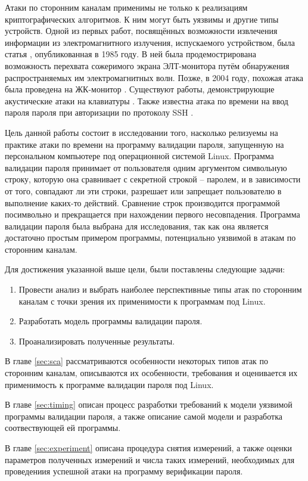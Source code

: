 Атаки по сторонним каналам применимы не только к реализациям криптографических
алгоритмов. К ним могут быть уязвимы и другие типы устройств. Одной из первых
работ, посвящённых возможности извлечения информации из электромагнитного
излучения, испускаемого устройством, была статья \cite{van-eck}, опубликованная
в 1985 году. В ней была продемострирована возможность перехвата сожеримого
экрана ЭЛТ-монитора путём обнаружения распространяемых им электромагнитных волн.
Позже, в 2004 году, похожая атака была проведена на ЖК-монитор \cite{kuhn}.
Существуют работы, демонстрирующие акустические атаки на клавиатуры
\cite{asonov} \cite{zhuang}. Также известна атака по времени на ввод пароля пароля
при авторизации по протоколу SSH \cite{ssh}.

Цель данной работы состоит в исследовании того, насколько релизуемы на практике
атаки по времени на программу валидации пароля, запущенную на персональном
компьютере под операционной системой Linux. Программа валидации пароля
принимает от пользователя одним аргументом символьную строку, которую она
сравнивает с секретной строкой -- паролем, и в зависимости от того, совпадают
ли эти строки, разрешает или запрещает пользователю в выполнение каких-то
действий. Сравнение строк производится программой посимвольно и прекращается
при нахождении первого несовпадения. Программа валидации пароля была выбрана
для исследования, так как она является достаточно простым примером программы,
потенциально уязвимой в атакам по сторонним каналам.

Для достижения указанной выше цели, были поставлены следующие задачи:
\begin{enumerate}
\item Провести анализ и выбрать наиболее перспективные типы атак по сторонним
  каналам с точки зрения их применимости к программам под Linux.
\item Разработать модель программы валидации пароля.
\item Проанализировать полученные результаты.
\end{enumerate}

В главе \ref{sec:sca} рассматриваются особенности некоторых типов атак по
сторонним каналам, описываются их особенности, требования и оценивается
их применимость к программе валидации пароля под Linux.

В главе \ref{sec:timing} описан процесс разработки требований к модели уязвимой
программы валидации пароля, а также описание самой модели и разработка
соотвествующей ей программы.

В главе \ref{sec:experiment} описана процедура снятия измерений, а также оценки
параметров полученных измерений и числа таких измерений, необходимых для
проведениия успешной атаки на программу верификации пароля.

\clearpage
